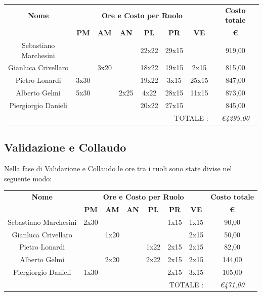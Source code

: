 \documentclass[12pt,a4paper,titlepage]{article}
\begin{document}
	{\renewcommand\arraystretch{1.2}  %
		\begin{tabular}{|c|c|c|c|c|c|c|c|}
			\hline 
			\textbf{Nome} & \multicolumn{6}{c|}{\textbf{Ore e Costo per Ruolo}} & \textbf{Costo totale} \\ 
			& \textbf{PM} & \textbf{AM} & \textbf{AN} & \textbf{PL} & \textbf{PR} & \textbf{VE} & \textbf{ \euro } \\ 
			\hline
			Sebastiano Marchesini &  &  &  & 22x22 & 29x15 &  & 919,00 \\ 
			\hline 
			Gianluca Crivellaro &  & 3x20 &  & 18x22 & 19x15 & 2x15 & 815,00 \\ 
			\hline 
			Pietro Lonardi & 3x30 &  &  & 19x22 & 3x15 & 25x15 & 847,00 \\ 
			\hline 
			Alberto Gelmi & 5x30 &  & 2x25 & 4x22 & 28x15 & 11x15 & 873,00 \\ 
			\hline 
			Piergiorgio Danieli &  &  &  & 20x22 & 27x15 &  & 845,00 \\ 
			\hline 
			\multicolumn{7}{r|}{TOTALE  :} & \textit{\euro 4299,00} \\ 
	\end{tabular}} 
	
	\subsection{Validazione e Collaudo}
	Nella fase di Validazione e Collaudo le ore tra i ruoli sono state divise nel seguente modo:
	\\
	
	{\renewcommand\arraystretch{1.2}  %
		\begin{tabular}{|c|c|c|c|c|c|c|c|}
			\hline 
			\textbf{Nome} & \multicolumn{6}{c|}{\textbf{Ore e Costo per Ruolo}} & \textbf{Costo totale} \\ 
			& \textbf{PM} & \textbf{AM} & \textbf{AN} & \textbf{PL} & \textbf{PR} & \textbf{VE} & \textbf{ \euro } \\ 
			\hline
			Sebastiano Marchesini & 2x30 &  &  &  & 1x15 & 1x15 & 90,00 \\ 
			\hline 
			Gianluca Crivellaro &  & 1x20 &  &  &  & 2x15 & 50,00 \\ 
			\hline 
			Pietro Lonardi &  &  &  & 1x22 & 2x15 & 2x15 & 82,00 \\ 
			\hline 
			Alberto Gelmi &  & 2x20 &  & 2x22 & 2x15 & 2x15 & 144,00 \\ 
			\hline 
			Piergiorgio Danieli & 1x30 &  &  &  & 2x15 & 3x15 & 105,00 \\ 
			\hline 
			\multicolumn{7}{r|}{TOTALE  :} & \textit{\euro 471,00} \\ 
	\end{tabular}} 
	
\end{document}
